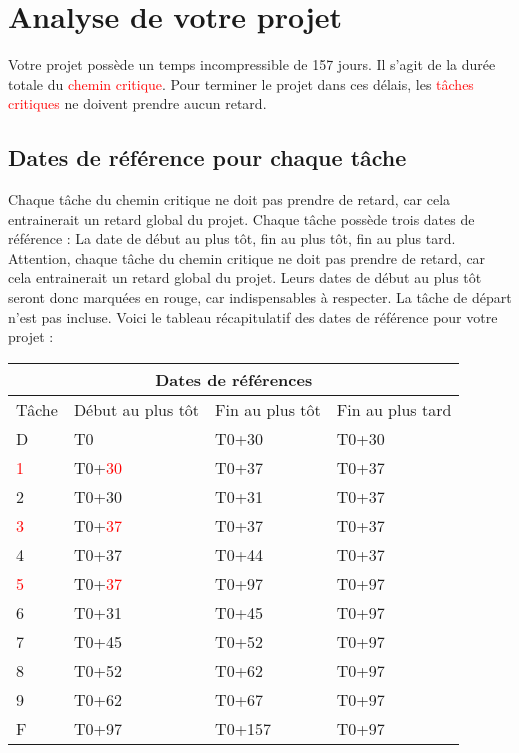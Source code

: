 \documentclass{article}
\begin{document}
\section{Analyse de votre projet}
Votre projet possède un temps incompressible de 157 jours.
    Il s'agit de la durée totale du \textcolor{red}{chemin critique}.
    Pour terminer le projet dans ces délais, les \textcolor{red}{tâches critiques} ne doivent prendre aucun retard.\subsection{Dates de référence pour chaque tâche}Chaque tâche du chemin critique ne doit pas prendre de
    retard, car cela entrainerait un retard global du projet. 
    Chaque tâche possède trois dates de référence : La date de début au plus tôt,
    fin au plus tôt, fin au plus tard.
    Attention, chaque tâche du chemin critique ne doit pas prendre de
    retard, car cela entrainerait un retard global du projet.
    Leurs dates de début au plus tôt seront donc marquées en rouge,
    car indispensables à respecter. La tâche de départ n'est pas incluse. \newpage 
    Voici le tableau récapitulatif des dates de référence pour votre projet :\newline 
\begin{tabular}{ |p{3cm}||p{3cm}|p{3cm}|p{3cm}|  }
        \hline
        \multicolumn{4}{|c|}{Dates de références} \\
        \hline 
        Tâche&Début au plus tôt&Fin au plus tôt&Fin au plus tard \\ 
        \hline 
D&T0&T0+30&T0+30 \\ 
\textcolor{red}{1}&T0+\textcolor{red}{30}&T0+37&T0+37 \\ 
2&T0+30&T0+31&T0+37 \\ 
\textcolor{red}{3}&T0+\textcolor{red}{37}&T0+37&T0+37 \\ 
4&T0+37&T0+44&T0+37 \\ 
\textcolor{red}{5}&T0+\textcolor{red}{37}&T0+97&T0+97 \\ 
6&T0+31&T0+45&T0+97 \\ 
7&T0+45&T0+52&T0+97 \\ 
8&T0+52&T0+62&T0+97 \\ 
9&T0+62&T0+67&T0+97 \\ 
F&T0+97&T0+157&T0+97 \\ 
\hline
    \end{tabular} 
\end{document}

